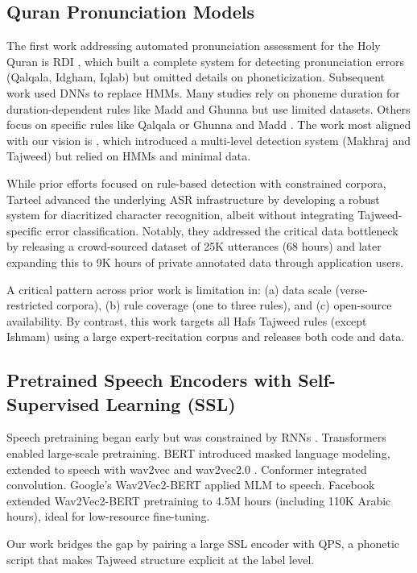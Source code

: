 \subsection{Quran Pronunciation Models}
The first work addressing automated pronunciation assessment for the Holy Quran is RDI \cite{sherif2007enhancing}, which built a complete system for detecting pronunciation errors (Qalqala, Idgham, Iqlab) but omitted details on phoneticization. Subsequent work \cite{abdou2014computer, al2018computer} used DNNs to replace HMMs. Many studies rely on phoneme duration for duration-dependent rules like Madd and Ghunna \cite{mohammed2017recognition, alqadasi2023improving} but use limited datasets. Others focus on specific rules like Qalqala \cite{omran2023automatic} or Ghunna and Madd \cite{shaiakhmetov2025evaluation,10485145}. The work most aligned with our vision is \cite{putra2012developing}, which introduced a multi-level detection system (Makhraj and Tajweed) but relied on HMMs and minimal data.

While prior efforts focused on rule-based detection with constrained corpora, Tarteel \cite{khan2021tarteel} advanced the underlying ASR infrastructure by developing a robust system for diacritized character recognition, albeit without integrating Tajweed-specific error classification. Notably, they addressed the critical data bottleneck by releasing a crowd-sourced dataset of 25K utterances (68 hours) and later expanding this to 9K hours of private annotated data through application users.

A critical pattern across prior work is limitation in: (a) data scale (verse-restricted corpora), (b) rule coverage (one to three rules), and (c) open-source availability. By contrast, this work targets all Hafs Tajweed rules (except Ishmam) using a large expert-recitation corpus and releases both code and data.

\subsection{Pretrained Speech Encoders with Self-Supervised Learning (SSL)}
Speech pretraining began early \cite{hinton2006reducing} but was constrained by RNNs \cite{hopfield1982neural}. Transformers \cite{vaswani2017attention} enabled large-scale pretraining. BERT \cite{devlin2019bert} introduced masked language modeling, extended to speech with wav2vec \cite{schneider2019wav2vec} and wav2vec2.0 \cite{baevski2020wav2vec}. Conformer \cite{gulati2020conformer} integrated convolution. Google's Wav2Vec2-BERT \cite{chung2021w2v} applied MLM to speech. Facebook extended Wav2Vec2-BERT pretraining \cite{barrault2023seamless} to 4.5M hours (including 110K Arabic hours), ideal for low-resource fine-tuning.

Our work bridges the gap by pairing a large SSL encoder with QPS, a phonetic script that makes Tajweed structure explicit at the label level.

